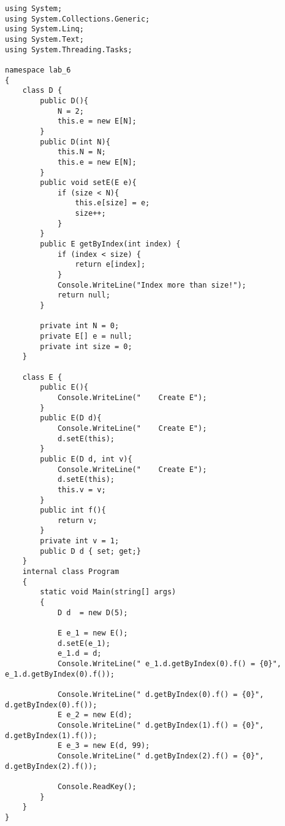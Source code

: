 \begin{lstlisting}[language={[Sharp]C}]
using System;
using System.Collections.Generic;
using System.Linq;
using System.Text;
using System.Threading.Tasks;

namespace lab_6
{
    class D {
        public D(){ 
            N = 2; 
            this.e = new E[N];
        }
        public D(int N){
            this.N = N;
            this.e = new E[N];
        }
        public void setE(E e){ 
            if (size < N){ 
                this.e[size] = e; 
                size++; 
            } 
        }
        public E getByIndex(int index) {
            if (index < size) {
                return e[index];
            }
            Console.WriteLine("Index more than size!");
            return null;
        }
      
        private int N = 0;
        private E[] e = null; 
        private int size = 0;
    }

    class E {
        public E(){
            Console.WriteLine("    Create E");
        }
        public E(D d){ 
            Console.WriteLine("    Create E");
            d.setE(this);
        } 
        public E(D d, int v){ 
            Console.WriteLine("    Create E");
            d.setE(this);
            this.v = v;
        }     
        public int f(){ 
            return v; 
        }
        private int v = 1; 
        public D d { set; get;}
    }
    internal class Program
    {
        static void Main(string[] args)
        {
            D d  = new D(5);

            E e_1 = new E();
            d.setE(e_1);
            e_1.d = d;
            Console.WriteLine(" e_1.d.getByIndex(0).f() = {0}", e_1.d.getByIndex(0).f());

            Console.WriteLine(" d.getByIndex(0).f() = {0}", d.getByIndex(0).f());
            E e_2 = new E(d);
            Console.WriteLine(" d.getByIndex(1).f() = {0}", d.getByIndex(1).f());
            E e_3 = new E(d, 99);
            Console.WriteLine(" d.getByIndex(2).f() = {0}", d.getByIndex(2).f());

            Console.ReadKey();
        }
    }
}

\end{lstlisting}